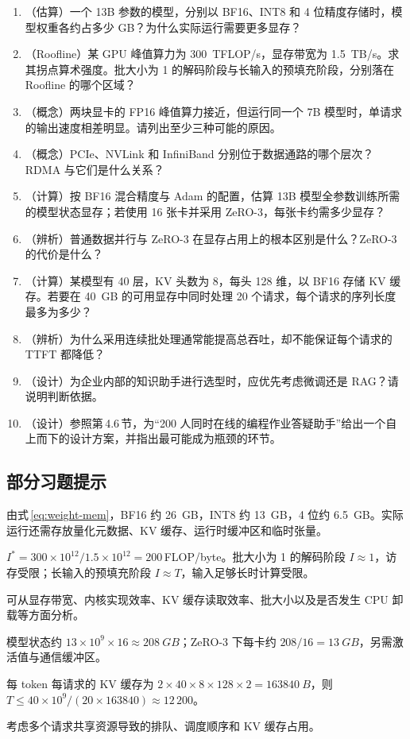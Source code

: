\documentclass{article}
\begin{document}
\begin{enumerate}[label=\thechapter.\arabic*,leftmargin=2.6em,itemsep=4pt]
  \item （估算）一个 13B 参数的模型，分别以 BF16、INT8 和 4 位精度存储时，模型权重各约占多少 GB？为什么实际运行需要更多显存？
  \item （Roofline）某 GPU 峰值算力为 \SI{300}{TFLOP/s}，显存带宽为 \SI{1.5}{TB/s}。求其拐点算术强度。批大小为 1 的解码阶段与长输入的预填充阶段，分别落在 Roofline 的哪个区域？
  \item （概念）两块显卡的 FP16 峰值算力接近，但运行同一个 7B 模型时，单请求的输出速度相差明显。请列出至少三种可能的原因。
  \item （概念）PCIe、NVLink 和 InfiniBand 分别位于数据通路的哪个层次？RDMA 与它们是什么关系？
  \item （计算）按 BF16 混合精度与 Adam 的配置，估算 13B 模型全参数训练所需的模型状态显存；若使用 16 张卡并采用 ZeRO-3，每张卡约需多少显存？
  \item （辨析）普通数据并行与 ZeRO-3 在显存占用上的根本区别是什么？ZeRO-3 的代价是什么？
  \item （计算）某模型有 40 层，KV 头数为 8，每头 128 维，以 BF16 存储 KV 缓存。若要在 \SI{40}{GB} 的可用显存中同时处理 20 个请求，每个请求的序列长度最多为多少？
  \item （辨析）为什么采用连续批处理通常能提高总吞吐，却不能保证每个请求的 TTFT 都降低？
  \item （设计）为企业内部的知识助手进行选型时，应优先考虑微调还是 RAG？请说明判断依据。
  \item （设计）参照第\,4.6\,节，为“200 人同时在线的编程作业答疑助手”给出一个自上而下的设计方案，并指出最可能成为瓶颈的环节。
\end{enumerate}

\subsection*{部分习题提示}
\begin{small}
\begin{description}[leftmargin=2.6em, labelwidth=2.2em, font=\normalfont]
  \item[4.1] 由式\,\eqref{eq:weight-mem}，BF16 约 \SI{26}{GB}，INT8 约 \SI{13}{GB}，4 位约 \SI{6.5}{GB}。实际运行还需存放量化元数据、KV 缓存、运行时缓冲区和临时张量。
  \item[4.2] $I^{*}=300\times10^{12}/1.5\times10^{12}=200$\,FLOP/byte。批大小为 1 的解码阶段 $I\approx1$，访存受限；长输入的预填充阶段 $I\approx T$，输入足够长时计算受限。
  \item[4.3] 可从显存带宽、内核实现效率、KV 缓存读取效率、批大小以及是否发生 CPU 卸载等方面分析。
  \item[4.5] 模型状态约 $13\times10^9\times16\approx\SI{208}{GB}$；ZeRO-3 下每卡约 $208/16=\SI{13}{GB}$，另需激活值与通信缓冲区。
  \item[4.7] 每 token 每请求的 KV 缓存为 $2\times40\times8\times128\times2=\SI{163840}{B}$，则 $T\le 40\times10^{9}/(20\times163840)\approx 12\,200$。
  \item[4.8] 考虑多个请求共享资源导致的排队、调度顺序和 KV 缓存占用。
\end{description}
\end{small}
\end{document}
